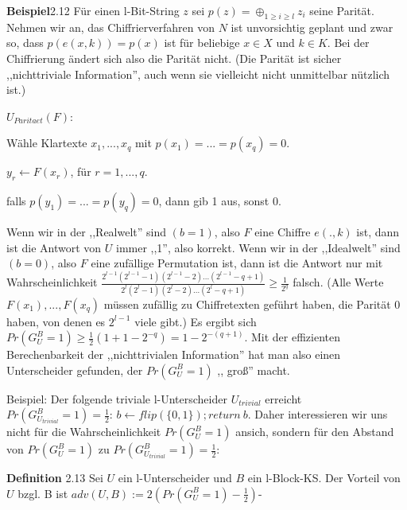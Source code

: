 \documentclass[a4paper]{article}
\begin{document}
\begin{multicols}{3}
    \textbf{Beispiel}2.12 Für einen l-Bit-String $z$ sei $p(z)=\oplus_{1 \geq i\geq l} z_i$ seine Parität. Nehmen wir an, das Chiffrierverfahren von $N$ ist unvorsichtig geplant und zwar so, dass $p(e(x,k)) =p(x)$ ist für beliebige $x\in X$ und $k\in K$. Bei der Chiffrierung ändert sich also die Parität nicht. (Die Parität ist sicher ,,nichttriviale Information'', auch wenn sie vielleicht nicht unmittelbar nützlich ist.)

    $U_{Paritaet}(F)$:
    \begin{enumerate*}
        \item Wähle Klartexte $x_1,...,x_q$ mit $p(x_1)=...=p(x_q) = 0$.
        \item $y_r\leftarrow F(x_r)$, für $r=1,...,q$.
        \item falls $p(y_1)=...=p(y_q)=0$, dann gib 1 aus, sonst 0.
    \end{enumerate*}

    Wenn wir in der ,,Realwelt'' sind $(b=1)$, also $F$ eine Chiffre $e(.,k)$ ist, dann ist die Antwort von $U$ immer ,,1'', also korrekt. Wenn wir in der ,,Idealwelt'' sind $(b=0)$, also $F$ eine zufällige Permutation ist, dann ist die Antwort nur mit Wahrscheinlichkeit $\frac{2^{l-1} (2^{l-1} -1)(2^{l-1}-2)...(2^{l-1} -q+ 1)}{2^l (2^l-1)(2^l-2)...(2^l-q+ 1)} \geq \frac{1}{2^q}$ falsch. (Alle Werte $F(x_1),...,F(x_q)$ müssen zufällig zu Chiffretexten geführt haben, die Parität 0 haben, von denen es $2^{l-1}$ viele gibt.) Es ergibt sich $Pr(G^B_U= 1)\geq\frac{1}{2} (1+1-2^{-q}) =1-2^{-(q+1)}$. Mit der effizienten Berechenbarkeit der ,,nichttrivialen Information'' hat man also einen Unterscheider gefunden, der $Pr(G^B_U=1)$ ,, groß'' macht.

    Beispiel: Der folgende triviale l-Unterscheider $U_{trivial}$ erreicht $Pr(G^B_{U_{trivial}}= 1)=\frac{1}{2}$: $b\leftarrow flip(\{0,1\}); return\ b$.
    Daher interessieren wir uns nicht für die Wahrscheinlichkeit $Pr(G^B_U= 1)$ ansich, sondern für den Abstand von $Pr(G^B_U=1)$ zu $Pr(G^B_{U_{trivial}}= 1) =\frac{1}{2}$:

    \textbf{Definition} 2.13 Sei $U$ ein l-Unterscheider und $B$ ein l-Block-KS. Der Vorteil von $U$ bzgl. B ist $adv(U,B):= 2(Pr(G^B_U=1)-\frac{1}{2})$-


\end{multicols}
\end{document}
